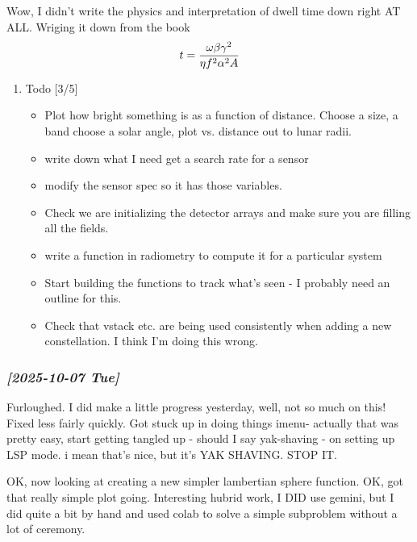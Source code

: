\documentclass[11pt]{article}
\begin{document}
Wow, I didn't write the physics and interpretation of dwell time down right AT ALL.
Wriging it down from the book 
$$t = {\omega\beta\gamma^2 \over   \eta f^2 \alpha^2  A  }  $$

\begin{enumerate}
\item Todo  [3/5]
\label{sec:org86b7260}
\begin{itemize}
\item[{$\boxtimes$}] Plot how bright something is as a function of distance. Choose a size, a band
choose a solar angle, plot vs. distance out to lunar radii.
\item[{$\boxtimes$}] write down what I need get a search rate for a sensor
\item[{$\boxtimes$}] modify the sensor spec so it has those variables.
\item[{$\square$}] Check we are initializing the detector arrays and make sure you are filling
all the fields.
\item[{$\square$}] write a function in radiometry to compute it for a particular system
\item[{$\square$}] Start building the functions to track what's seen - I probably need
an outline for this.
\item[{$\square$}] Check that vstack etc. are being used consistently when adding a new constellation.
I think I'm doing this wrong.
\end{itemize}
\end{enumerate}

\subsubsection{\textit{[2025-10-07 Tue]}}
\label{sec:org233accf}
Furloughed.  I did make a little progress yesterday, well, not so much on this!
Fixed less fairly quickly.
Got stuck up in doing things imenu- actually that was pretty easy, start getting
tangled up - should I say yak-shaving - on setting up LSP mode.  i mean that's nice,
but it's YAK SHAVING. STOP IT.

OK, now looking at creating a new simpler lambertian sphere function.
OK, got that really simple plot going. Interesting hubrid work, I DID use
gemini, but I did quite a bit by hand and used colab to solve a simple subproblem
without a lot of ceremony.  
\end{document}
